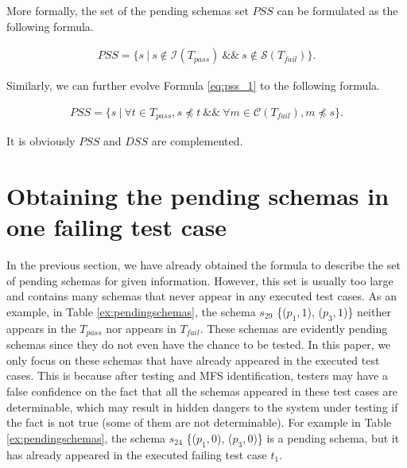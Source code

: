 More formally, the set of the pending schemas set $PSS$ can be formulated as the following formula.


\begin{equation}
\begin{aligned}\label{eq:pss_1}
PSS=\{ s\ |\ s \not\in  \mathcal{I}(T_{pass}) \ \&\& \  s \not\in \mathcal{S}(T_{fail}) \} .
\end{aligned}
\end{equation}

Similarly, we can further evolve Formula \ref{eq:pss_1} to the following formula.

\begin{equation}
\begin{aligned}\label{eq:pss}
PSS=\{ s\ |\ \forall t \in T_{pass},  s \npreceq t  \ \&\& \  \forall m \in \mathcal{C}(T_{fail}), m \npreceq s \}.
\end{aligned}
\end{equation}

It is obviously $PSS$ and $DSS$ are complemented.

%
%

%

\section{Obtaining the pending schemas in one failing test case}\label{sec:pending:obtaining}

In the previous section, we have already obtained the formula to describe the set of pending schemas for given information. However, this set is usually too large and contains many schemas that never appear in any executed test cases. As an example, in Table \ref{ex:pendingschemas}, the schema $s_{29}$ \{($p_{1}, 1$), ($p_{3}, 1$)\} neither appears in the $T_{pass}$ nor appears in $T_{fail}$. These schemas are evidently pending schemas since they do not even have the chance to be tested. In this paper, we only focus on these schemas that have already appeared in the executed test cases. This is because after testing and MFS identification, testers may have a false confidence on the fact that all the schemas appeared in these test cases are determinable, which may result in hidden dangers to the system under testing if the fact is not true (some of them are not determinable). For example in Table \ref{ex:pendingschemas}, the schema $s_{24}$  \{($p_{1}, 0$), ($p_{3}, 0$)\} is a pending schema, but it has already appeared in the executed failing test case $t_{1}$.

